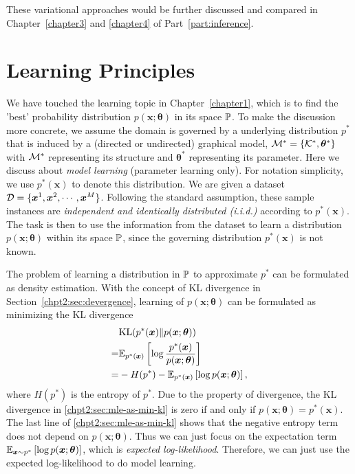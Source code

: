 These variational approaches would be further discussed and compared in Chapter~\ref{chapter3} and \ref{chapter4} of Part~\ref{part:inference}.

\section{Learning Principles}
\label{chpt2:sec:learning-principles}
We have touched the learning topic in Chapter~\ref{chapter1}, which is to find the 'best' probability distribution $p(\bm{x}; \bm{\theta})$ in its space $\mathbb{P}$. To make the discussion more concrete, we assume the domain is governed by a underlying distribution $p^{\ast}$ that is induced by a (directed or undirected) graphical model, $\mathcal{M}^{\ast} = \left\{ \mathcal{K}^{\ast}, \bm{\theta}^{\ast} \right\}$ with $\mathcal{M}^{\ast}$ representing its structure and $\bm{\theta}^{\ast}$ representing its parameter. Here we discuss about \textit{model learning} (parameter learning only). For notation simplicity, we use $p^{\ast}(\bm{x})$ to denote this distribution. We are given a dataset $\mathcal{D} = \{\bm{x}^{1}, \bm{x}^{2}, \cdots, \bm{x}^{M}\}$. Following the standard assumption, these sample instances are \textit{independent and identically distributed (i.i.d.)} according to $p^{\ast}(\bm{x})$. The task is then to use the information from the dataset to learn a distribution $p(\bm{x};\bm{\theta})$ within its space $\mathbb{P}$, since the governing distribution $p^{\ast}(\bm{x})$ is not known.

The problem of learning a distribution in $\mathbb{P}$ to approximate $p^{\ast}$ can be formulated as density estimation. With the concept of KL divergence in Section~\ref{chpt2:sec:devergence}, learning of $p(\bm{x};\bm{\theta})$ can be formulated as minimizing the KL divergence
\begin{align}\label{chpt2:sec:mle-as-min-kl}
  &\mathrm{KL}(p^{\ast}(\bm{x})\|p(\bm{x}; \bm{\theta})) \nonumber \\
  =& \mathbb{E}_{p^{\ast}(\bm{x})}\left[ \log{\frac{p^{\ast}(\bm{x})}{p(\bm{x}; \bm{\theta})}} \right] \nonumber \\
  =& - H(p^{\ast}) - \mathbb{E}_{p^{\ast}(\bm{x})}\left[ \log{{p(\bm{x}; \bm{\theta})}} \right],
\end{align}
where $H(p^{\ast})$ is the entropy of $p^{\ast}$.
Due to the property of divergence, the KL divergence in \eqref{chpt2:sec:mle-as-min-kl} is zero if and only if $p(\bm{x};\bm{\theta})=p^{\ast}(\bm{x})$. The last line of \eqref{chpt2:sec:mle-as-min-kl} shows that the negative entropy term does not depend on $p(\bm{x}; \bm{\theta})$. Thus we can just focus on the expectation term $\mathbb{E}_{\bm{x} \sim p^{\ast}}\left[ \log{{p(\bm{x}; \bm{\theta})}} \right]$, which is \textit{expected log-likelihood}. Therefore, we can just use the expected log-likelihood to do model learning.

